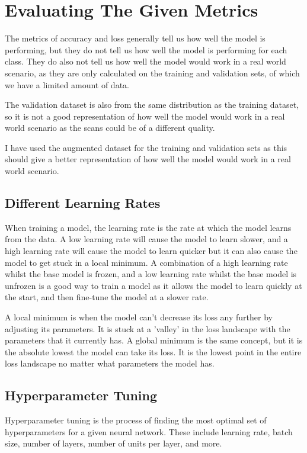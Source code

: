 \documentclass[]{final_report}
\begin{document}
\section{Evaluating The Given Metrics}
The metrics of accuracy and loss generally tell us how well the model is performing,
but they do not tell us how well the model is performing for each class.
They do also not tell us how well the model would work in a real world scenario,
as they are only calculated on the training and validation sets, of which we have a limited amount of data.

The validation dataset is also from the same distribution as the training dataset,
so it is not a good representation of how well the model would work in a real world scenario
as the scans could be of a different quality.

I have used the augmented dataset for the training and validation sets as this
should give a better representation of how well the model would work in a real world scenario.

\subsection{Different Learning Rates}

When training a model, the learning rate is the rate at which the model learns from the data.
A low learning rate will cause the model to learn slower, and a high learning rate will cause the model to learn quicker
but it can also cause the model to get stuck in a local minimum. A combination of a high learning rate whilst the base model is frozen, and a low learning rate whilst the base model is unfrozen is a good way to train a model as it allows the model to learn quickly at the start, and then fine-tune the model at a slower rate.

A local minimum is when the model can't decrease its loss any further by adjusting its parameters.
It is stuck at a 'valley' in the loss landscape with the parameters that it currently has.
A global minimum is the same concept, but it is the absolute lowest the model can take its loss.
It is the lowest point in the entire loss landscape no matter what parameters the model has.

\subsection{Hyperparameter Tuning}

Hyperparameter tuning is the process of finding the most optimal set of hyperparameters for a given neural network. These include learning rate, batch size, number of layers, number of units per layer, and more.
\end{document}
